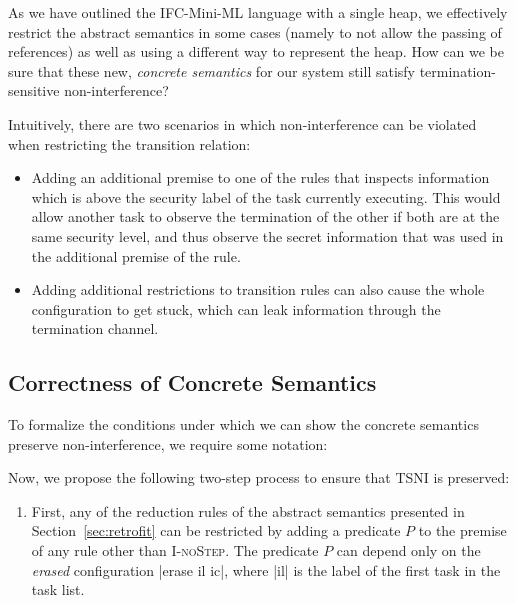 
As we have outlined the IFC-Mini-ML language with a single heap, we
effectively restrict the abstract semantics in some cases (namely
to not allow the passing of references) as well as using a different
way to represent the heap.  How can we be sure that these
new, \textit{concrete semantics} for our system still satisfy
termination-sensitive non-interference?

Intuitively, there are two scenarios in which non-interference
can be violated when restricting the transition relation:
\begin{itemize}
  \item Adding an additional premise to one of the rules that inspects
  information which is above the security label of the task currently
  executing.  This would allow another task to observe the termination
  of the other if both are at the same security level, and thus observe
  the secret information that was used in the additional
  premise of the rule.
  \item Adding additional restrictions to transition rules can
  also cause the whole configuration to get stuck, which can leak
  information through the termination channel.
\end{itemize}


\subsection{Correctness of Concrete Semantics}

To formalize the conditions under which we can show the concrete
semantics preserve non-interference, we require some notation:


Now, we propose the following two-step process to ensure that
TSNI is preserved:
\begin{enumerate}
  \item First, any of the reduction rules of the abstract
  semantics presented in Section~\ref{sec:retrofit} can
  be restricted by adding a predicate $P$ to the premise of
  any rule other than \textsc{I-noStep}.  The predicate $P$
  can depend only on the \textit{erased} configuration
  |erase il ic|, where |il| is the label of the first task
  in the task list.
\end{enumerate}


